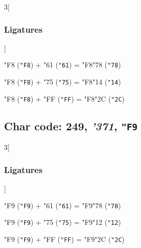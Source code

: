 \documentclass{article}
\newlength{\maxcharwidth}
\begin{document}

\begin{multicols}{3}[\subsubsection{Ligatures}]

{\testfont\char"F8\noboundary} ({\tt"F8}) + {\testfont\char"61\noboundary} ({\tt"61}) = {\testfont\char"F8\noboundary}{\testfont\char"78\noboundary} ({\tt"78}) 

{\testfont\char"F8\noboundary} ({\tt"F8}) + {\testfont\char"75\noboundary} ({\tt"75}) = {\testfont\char"F8\noboundary}{\testfont\char"14\noboundary} ({\tt"14}) 

{\testfont\char"F8\noboundary} ({\tt"F8}) + {\testfont\char"FF\noboundary} ({\tt"FF}) = {\testfont\char"F8\noboundary}{\testfont\char"2C\noboundary} ({\tt"2C}) 

\end{multicols}

\subsection{Char code: 249, {\it'371}, {\tt"F9}}
\label{char_249}


\begin{multicols}{3}[\subsubsection{Ligatures}]

{\testfont\char"F9\noboundary} ({\tt"F9}) + {\testfont\char"61\noboundary} ({\tt"61}) = {\testfont\char"F9\noboundary}{\testfont\char"78\noboundary} ({\tt"78}) 

{\testfont\char"F9\noboundary} ({\tt"F9}) + {\testfont\char"75\noboundary} ({\tt"75}) = {\testfont\char"F9\noboundary}{\testfont\char"12\noboundary} ({\tt"12}) 

{\testfont\char"F9\noboundary} ({\tt"F9}) + {\testfont\char"FF\noboundary} ({\tt"FF}) = {\testfont\char"F9\noboundary}{\testfont\char"2C\noboundary} ({\tt"2C}) 

\end{multicols}
\end{document}

